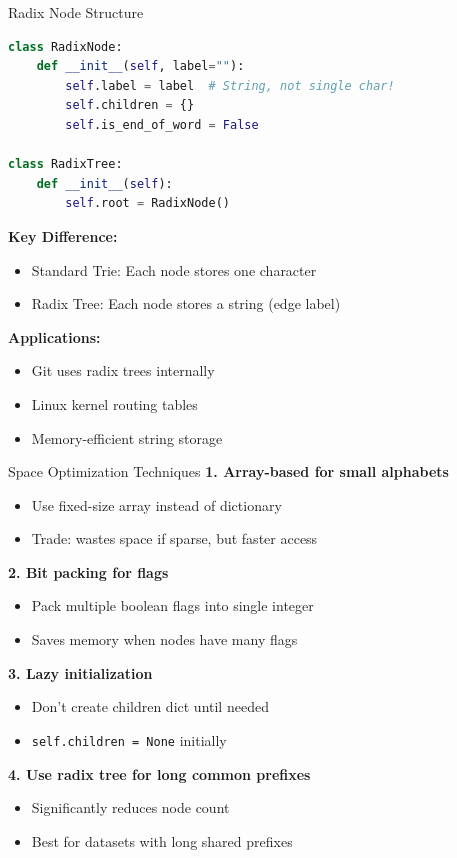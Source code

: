 \documentclass[aspectratio=169]{beamer}
\begin{document}
\begin{frame}[fragile]{Radix Node Structure}
  \begin{lstlisting}[language=Python, basicstyle=\ttfamily\small]
class RadixNode:
    def __init__(self, label=""):
        self.label = label  # String, not single char!
        self.children = {}
        self.is_end_of_word = False

class RadixTree:
    def __init__(self):
        self.root = RadixNode()
  \end{lstlisting}

  \vspace{0.3cm}
  \textbf{Key Difference:}
  \begin{itemize}
    \item Standard Trie: Each node stores one character
    \item Radix Tree: Each node stores a string (edge label)
  \end{itemize}

  \vspace{0.3cm}
  \textbf{Applications:}
  \begin{itemize}
    \item Git uses radix trees internally
    \item Linux kernel routing tables
    \item Memory-efficient string storage
  \end{itemize}
\end{frame}

\begin{frame}{Space Optimization Techniques}
  \textbf{1. Array-based for small alphabets}
  \begin{itemize}
    \item Use fixed-size array instead of dictionary
    \item Trade: wastes space if sparse, but faster access
  \end{itemize}

  \vspace{0.3cm}
  \textbf{2. Bit packing for flags}
  \begin{itemize}
    \item Pack multiple boolean flags into single integer
    \item Saves memory when nodes have many flags
  \end{itemize}

  \vspace{0.3cm}
  \textbf{3. Lazy initialization}
  \begin{itemize}
    \item Don't create children dict until needed
    \item \texttt{self.children = None} initially
  \end{itemize}

  \vspace{0.3cm}
  \textbf{4. Use radix tree for long common prefixes}
  \begin{itemize}
    \item Significantly reduces node count
    \item Best for datasets with long shared prefixes
  \end{itemize}
\end{frame}
\end{document}
